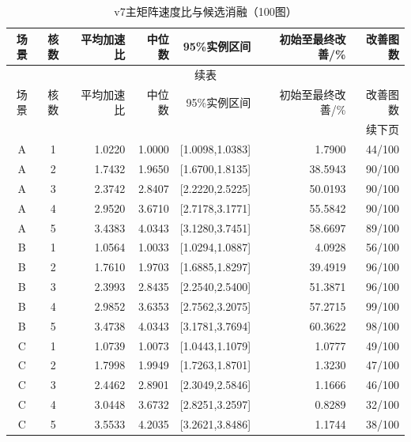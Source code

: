 \begin{longtable}{ccrrrrr}
\caption{v7主矩阵速度比与候选消融（100图）}\label{tab:v7-summary}\\
\toprule
场景 & 核数 & 平均加速比 & 中位数 & 95\%实例区间 & 初始至最终改善/\% & 改善图数 \\
\midrule
\endfirsthead
\multicolumn{7}{c}{续表}\\
\toprule
场景 & 核数 & 平均加速比 & 中位数 & 95\%实例区间 & 初始至最终改善/\% & 改善图数 \\
\midrule
\endhead
\midrule\multicolumn{7}{r}{续下页}\\
\endfoot
\bottomrule
\endlastfoot
A & 1 & 1.0220 & 1.0000 & [1.0098,1.0383] & 1.7900 & 44/100 \\
A & 2 & 1.7432 & 1.9650 & [1.6700,1.8135] & 38.5943 & 90/100 \\
A & 3 & 2.3742 & 2.8407 & [2.2220,2.5225] & 50.0193 & 90/100 \\
A & 4 & 2.9520 & 3.6710 & [2.7178,3.1771] & 55.5842 & 90/100 \\
A & 5 & 3.4383 & 4.0343 & [3.1280,3.7451] & 58.6697 & 89/100 \\
B & 1 & 1.0564 & 1.0033 & [1.0294,1.0887] & 4.0928 & 56/100 \\
B & 2 & 1.7610 & 1.9703 & [1.6885,1.8297] & 39.4919 & 96/100 \\
B & 3 & 2.3993 & 2.8435 & [2.2540,2.5400] & 51.3871 & 96/100 \\
B & 4 & 2.9852 & 3.6353 & [2.7562,3.2075] & 57.2715 & 99/100 \\
B & 5 & 3.4738 & 4.0343 & [3.1781,3.7694] & 60.3622 & 98/100 \\
C & 1 & 1.0739 & 1.0073 & [1.0443,1.1079] & 1.0777 & 49/100 \\
C & 2 & 1.7998 & 1.9949 & [1.7263,1.8701] & 1.3230 & 47/100 \\
C & 3 & 2.4462 & 2.8901 & [2.3049,2.5846] & 1.1666 & 46/100 \\
C & 4 & 3.0448 & 3.6732 & [2.8251,3.2597] & 0.8289 & 32/100 \\
C & 5 & 3.5533 & 4.2035 & [3.2621,3.8486] & 1.1744 & 38/100 \\
\end{longtable}
